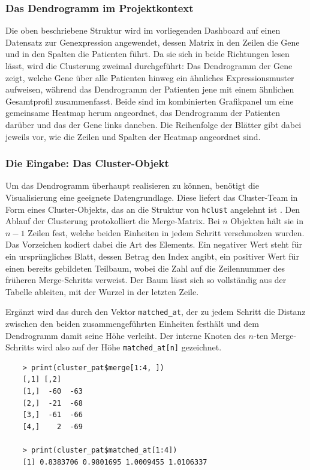 \documentclass[12pt]{article}
\newcommand{\code}[1]{\texttt{#1}}
\begin{document}
\subsubsection{Das Dendrogramm im Projektkontext}

Die oben beschriebene Struktur wird im vorliegenden Dashboard auf einen Datensatz 
zur Genexpression angewendet, dessen Matrix in den Zeilen die Gene und in den 
Spalten die Patienten führt. Da sie sich in beide Richtungen lesen lässt, wird 
die Clusterung zweimal durchgeführt: Das Dendrogramm der Gene zeigt, welche 
Gene über alle Patienten hinweg ein ähnliches Expressionsmuster aufweisen, während 
das Dendrogramm der Patienten jene mit einem ähnlichen Gesamtprofil zusammenfasst. 
Beide sind im kombinierten Grafikpanel um eine gemeinsame Heatmap herum angeordnet, das Dendrogramm der Patienten darüber und das der Gene links daneben. Die Reihenfolge der Blätter gibt dabei jeweils vor, wie die Zeilen und Spalten der Heatmap angeordnet sind.

\subsubsection{Die Eingabe: Das Cluster-Objekt}

Um das Dendrogramm überhaupt realisieren zu können, benötigt die Visualisierung 
eine geeignete Datengrundlage. Diese liefert das Cluster-Team in Form eines 
Cluster-Objekts, das an die Struktur von \code{hclust} angelehnt ist \cite{RCT2026}. Den Ablauf der Clusterung protokolliert die Merge-Matrix. Bei $n$ Objekten hält sie in $n-1$ 
Zeilen fest, welche beiden Einheiten in jedem Schritt verschmolzen wurden. Das 
Vorzeichen kodiert dabei die Art des Elements. Ein negativer Wert steht für ein 
ursprüngliches Blatt, dessen Betrag den Index angibt, ein positiver Wert für 
einen bereits gebildeten Teilbaum, wobei die Zahl auf die Zeilennummer des 
früheren Merge-Schritts verweist. Der Baum lässt sich so vollständig aus der 
Tabelle ableiten, mit der Wurzel in der letzten Zeile.

Ergänzt wird das durch den Vektor \code{matched\_at}, der zu jedem Schritt die 
Distanz zwischen den beiden zusammengeführten Einheiten festhält und dem 
Dendrogramm damit seine Höhe verleiht. Der interne Knoten des $n$-ten 
Merge-Schritts wird also auf der Höhe \code{matched\_at[n]} gezeichnet.

\begin{lstlisting}
	> print(cluster_pat$merge[1:4, ])
	[,1] [,2]
	[1,]  -60  -63
	[2,]  -21  -68
	[3,]  -61  -66
	[4,]    2  -69
	
	> print(cluster_pat$matched_at[1:4])
	[1] 0.8383706 0.9801695 1.0009455 1.0106337
\end{lstlisting}
\end{document}
